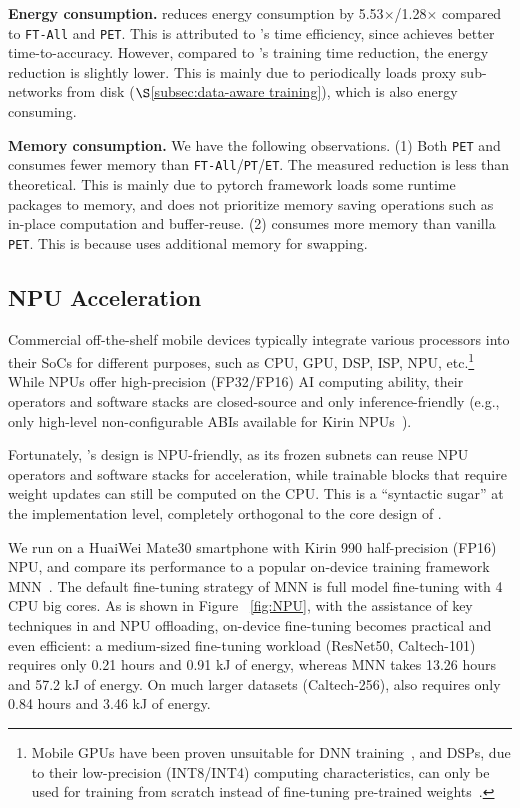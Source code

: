 \noindent \textbf{Energy consumption.} 
\sys reduces energy consumption by 5.53$\times$/1.28$\times$ compared to \texttt{FT-All} and \texttt{PET}.
This is attributed to \sys's time efficiency, since \sys achieves better time-to-accuracy.
However, compared to \sys's training time reduction, the energy reduction is slightly lower.
This is mainly due to \sys periodically loads proxy sub-networks from disk ($\S$\ref{subsec:data-aware training}), which is also energy consuming.

\noindent \textbf{Memory consumption.}
We have the following observations.
(1) Both \texttt{PET} and \sys consumes fewer memory than \texttt{FT-All}/\texttt{PT}/\texttt{ET}.
The measured reduction is less than theoretical. 
This is mainly due to pytorch framework loads some runtime packages to memory, and does not prioritize memory saving operations such as in-place computation and buffer-reuse.
(2) \sys consumes more memory than vanilla \texttt{PET}.
This is because \sys uses additional memory for swapping.

\subsection{NPU Acceleration}
\label{subsec:NPU}


Commercial off-the-shelf mobile devices typically integrate various processors into their SoCs for different purposes, such as CPU, GPU, DSP, ISP, NPU, etc.\footnote{Mobile GPUs have been proven unsuitable for DNN training~\cite{das2022enabling}, and DSPs, due to their low-precision (INT8/INT4) computing characteristics, can only be used for training from scratch instead of fine-tuning pre-trained weights~\cite{xu2022mandheling}.} 
While NPUs offer high-precision (FP32/FP16) AI computing ability, their operators and software stacks are closed-source and only inference-friendly (e.g., only high-level non-configurable ABIs available for Kirin NPUs~\cite{Hiai}).

Fortunately, \sys's design is NPU-friendly, as its frozen subnets can reuse NPU operators and software stacks for acceleration, while trainable blocks that require weight updates can still be computed on the CPU.
This is a ``syntactic sugar'' at the implementation level, completely orthogonal to the core design of \sys.

We run \sys on a HuaiWei Mate30 smartphone with Kirin 990 half-precision (FP16) NPU, and compare its performance to a popular on-device training framework MNN~\cite{MNN}. 
The default fine-tuning strategy of MNN is full model fine-tuning with 4 CPU big cores.
As is shown in Figure ~\ref{fig:NPU}, with the assistance of key techniques in \sys and NPU offloading, on-device fine-tuning becomes practical and even efficient:
a medium-sized fine-tuning workload (ResNet50, Caltech-101) requires only 0.21 hours and 0.91 kJ of energy, whereas MNN takes 13.26 hours and 57.2 kJ of energy. 
On much larger datasets (Caltech-256), \sys also requires only 0.84 hours and 3.46 kJ of energy.






